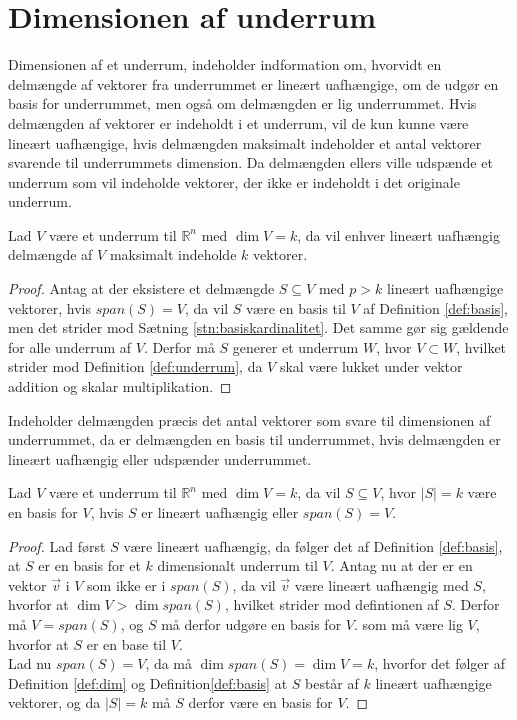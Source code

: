 \section{Dimensionen af underrum}
Dimensionen af et underrum, indeholder indformation om, hvorvidt en delmængde af vektorer fra underrummet er lineært uafhængige, om de udgør en basis for underrummet, men også om delmængden er lig underrummet.
Hvis delmængden af vektorer er indeholdt i et underrum, vil de kun kunne være lineært uafhængige, hvis delmængden maksimalt indeholder et antal vektorer svarende til underrummets dimension. 
Da delmængden ellers ville udspænde et underrum som vil indeholde vektorer, der ikke er indeholdt i det originale underrum.
\begin{kor}
Lad $V$ være et underrum til $\mathds{R}^n$ med $\dim{V}=k$, da vil enhver lineært uafhængig delmængde af $V$ maksimalt indeholde $k$ vektorer.
\label{kor:linearuafhangighedunderrum}
\end{kor}
\begin{proof}
Antag at der eksistere et delmængde $S \subseteq V$ med $p > k$ lineært uafhængige vektorer, hvis $span(S) = V$, da vil $S$ være en basis til $V$ af Definition \ref{def:basis}, men det strider mod Sætning \ref{stn:basiskardinalitet}. Det samme gør sig gældende for alle underrum af $V$.
Derfor må $S$ generer et underrum $W$, hvor $V \subset W$, hvilket strider mod Definition \ref{def:underrum}, da $V$ skal være lukket under vektor addition og skalar multiplikation.
\end{proof}
Indeholder delmængden præcis det antal vektorer som svare til dimensionen af underrummet, da er delmængden en basis til underrummet, hvis delmængden er lineært uafhængig eller udspænder underrummet.
\begin{kor}
Lad $V$ være et underrum til $\mathds{R}^n$ med $\dim{V}=k$, da vil $S \subseteq V$, hvor $|S|=k$ være en basis for $V$, hvis $S$ er lineært uafhængig eller $span(S) = V$.
\label{kor:serbase}
\end{kor}
\begin{proof}
Lad først $S$ være lineært uafhængig, da følger det af Definition \ref{def:basis}, at $S$ er en basis for et $k$ dimensionalt underrum til $V$.
Antag nu at der er en vektor $\vec{v}$ i $V$ som ikke er i $span(S)$, da vil $\vec{v}$ være lineært uafhængig med $S$, hvorfor at $\dim{V} > \dim{span(S)}$, hvilket strider mod defintionen af $S$. 
Derfor må $V = span(S)$, og $S$ må derfor udgøre en basis for $V$.
 som må være lig $V$, hvorfor at $S$ er en base til $V$.
\\Lad nu $span(S) = V$, da må $\dim{span(S)} = \dim{V} = k$, hvorfor det følger af Definition \ref{def:dim} og Definition\ref{def:basis} at $S$ består af $k$ lineært uafhængige vektorer, og da $|S|=k$ må $S$ derfor være en basis for $V$.
\end{proof}

